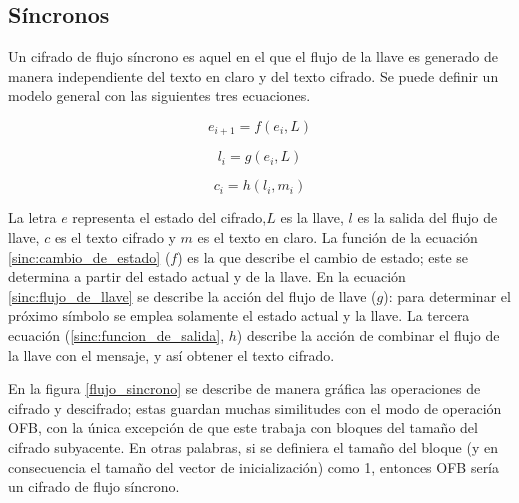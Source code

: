 %
%

\subsection{Síncronos}

Un cifrado de flujo síncrono es aquel en el que el flujo de la llave es
generado de manera independiente del texto en claro y del texto cifrado. Se
puede definir un modelo general con las siguientes tres ecuaciones.

\begin{equation}
  \label{sinc:cambio_de_estado}
  e_{i+1} = f(e_i, L)
\end{equation}

\begin{equation}
  \label{sinc:flujo_de_llave}
  l_i = g(e_i, L)
\end{equation}

\begin{equation}
  \label{sinc:funcion_de_salida}
  c_i = h(l_i, m_i)
\end{equation}

La letra $ e $ representa el estado del cifrado,$ L $ es la llave, $ l $ es
la salida del flujo de llave, $ c $ es el texto cifrado y $ m $ es el texto en
claro. La función de la ecuación \ref{sinc:cambio_de_estado} ($ f $) es la que
describe el cambio de estado; este se determina a partir del estado actual y
de la llave. En la ecuación \ref{sinc:flujo_de_llave} se describe la acción del
flujo de llave ($ g $): para determinar el próximo símbolo se emplea solamente
el estado actual y la llave. La tercera ecuación (\ref{sinc:funcion_de_salida},
$ h $) describe la acción de combinar el flujo de la llave con el mensaje, y
así obtener el texto cifrado.


En la figura \ref{flujo_sincrono} se describe de manera gráfica las operaciones
de cifrado y descifrado; estas guardan muchas similitudes con el modo de
operación OFB, con la única excepción de que este trabaja con bloques del tamaño
del cifrado subyacente. En otras palabras, si se definiera el tamaño del bloque
(y en consecuencia el tamaño del vector de inicialización) como 1, entonces
OFB sería un cifrado de flujo síncrono.

